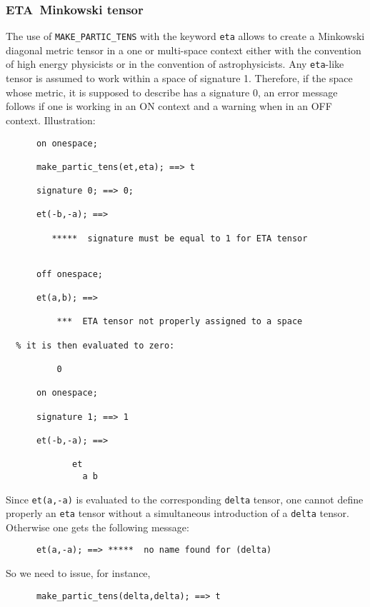 \subsubsection{ETA\ Minkowski tensor}
The use of \texttt{MAKE\_PARTIC\_TENS} with the 
keyword \texttt{eta} allows to create a Minkowski diagonal metric tensor in a 
one or multi-space context either with the convention of
 high energy physicists or in the convention of astrophysicists.
Any \texttt{eta}-like tensor is assumed to work within a space 
of signature 1. Therefore, if the space whose metric, it is supposed 
to describe has a signature 0, an error message follows if one is 
working in an ON 
context and a warning when in an OFF  context.
Illustration:
\begin{verbatim}
      on onespace;

      make_partic_tens(et,eta); ==> t

      signature 0; ==> 0;

      et(-b,-a); ==> 

         *****  signature must be equal to 1 for ETA tensor


      off onespace;

      et(a,b); ==> 
 
          ***  ETA tensor not properly assigned to a space

  % it is then evaluated to zero:

          0

      on onespace;   

      signature 1; ==> 1

      et(-b,-a); ==> 

             et
               a b 
\end{verbatim}
Since \texttt{et(a,-a)} is evaluated to the corresponding \texttt{delta} tensor,
 one cannot define properly an \texttt{eta} tensor without a 
simultaneous introduction of a  \texttt{delta} tensor. Otherwise one gets 
the following message:
\begin{verbatim}
      et(a,-a); ==> *****  no name found for (delta)
\end{verbatim}
So we need to issue, for instance, 
\begin{verbatim}
      make_partic_tens(delta,delta); ==> t
\end{verbatim}
